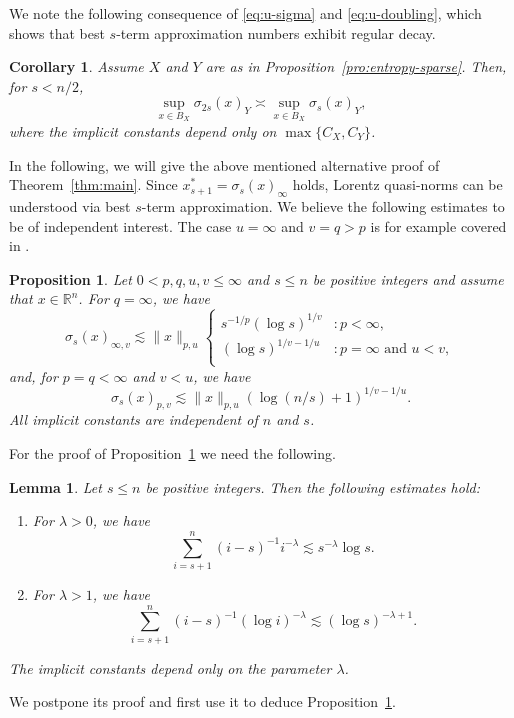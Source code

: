 \documentclass[a4paper,12pt]{article}
\newtheorem{lem}[thm]{Lemma}
\newtheorem{cor}[thm]{Corollary}
\newtheorem{prop}[thm]{Proposition}
\theoremstyle{definition}
\newcommand{\IR}{\mathbb{R}}
\begin{document}
We note the following consequence of \eqref{eq:u-sigma} and \eqref{eq:u-doubling}, which shows that best $s$-term approximation numbers exhibit regular decay.

\begin{cor}
Assume $X$ and $Y$ are as in Proposition~\ref{pro:entropy-sparse}. Then, for $s<n/2$, 
\[
\sup_{x\in B_X}\sigma_{2s}(x)_Y\asymp\sup_{x\in B_X}\sigma_s(x)_Y,
\]
where the implicit constants depend only on $\max\{C_X,C_Y\}$.
\end{cor}

In the following, we will give the above mentioned alternative proof of Theorem~\ref{thm:main}. Since $x_{s+1}^*=\sigma_s(x)_{\infty}$ holds, Lorentz quasi-norms can be understood via best $s$-term approximation. We believe the following estimates to be of independent interest. The case $u=\infty$ and $v=q>p$ is for example covered in \cite[Prop. 2.11]{FR13}. 

\begin{prop}\label{pro:s-term-app}
	Let $0<p,q,u,v\le \infty$ and $s\le n$ be positive integers and assume that $x\in\IR^n$. For $q=\infty$, we have
	\[
	\sigma_s(x)_{\infty,v}
	\lesssim
	\|x\|_{p,u}
	\begin{cases}
		s^{-1/p}(\log s)^{1/v}&\colon p<\infty,\\
		(\log s)^{1/v-1/u}&\colon p=\infty\text{ and } u<v,\\
	\end{cases}
	\]
	and, for $p=q<\infty$ and $v<u$, we have
	\[
	\sigma_s(x)_{p,v}
	\lesssim
	\|x\|_{p,u}
	(\log(n/s)+1)^{1/v-1/u}.
	\]
	All implicit constants are independent of $n$ and $s$.
\end{prop}

For the proof of Proposition~\ref{pro:s-term-app} we need the following.
\begin{lem}\label{lem:tail-asymp}
Let $s\le n$ be positive integers. Then the following estimates hold:
\begin{enumerate}[label=(\roman*)]
\item For $\lambda>0$, we have
\[
\sum_{i=s+1}^n (i-s)^{-1}i^{-\lambda}
\lesssim s^{-\lambda}\log s.
\]
\item For $\lambda>1$, we have
\[
\sum_{i=s+1}^n (i-s)^{-1}(\log i)^{-\lambda}
\lesssim (\log s)^{-\lambda+1}.
\]
\end{enumerate}
The implicit constants depend only on the parameter $\lambda$. 
\end{lem}
We postpone its proof and first use it to deduce Proposition~\ref{pro:s-term-app}.
\end{document}
